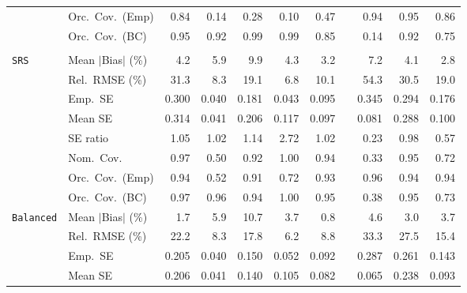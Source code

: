 \begin{landscape}
\begin{longtable}{llrrrrrrrrr}
 & Orc.\ Cov.\ (Emp) & 0.84 & 0.14 & 0.28 & 0.10 & 0.47 &  & \cellcolor{ranktwo}0.94 & \cellcolor{rankone}0.95 & \cellcolor{rankthree}0.86 \\
 & Orc.\ Cov.\ (BC) & \cellcolor{rankone}0.95 & \cellcolor{ranktwo}0.92 & \cellcolor{rankthree}0.99 & \cellcolor{rankthree}0.99 & 0.85 &  & 0.14 & \cellcolor{ranktwo}0.92 & 0.75 \\
\addlinespace[2pt]
\multicolumn{11}{l}{\textbf{Binary \& Categorical Phase-Two Covariates}} \\
\addlinespace[2pt]
\quad \texttt{SRS} & Mean $|$Bias$|$ (\%) & 4.2 & 5.9 & 9.9 & 4.3 & \cellcolor{ranktwo}3.2 &  & 7.2 & \cellcolor{rankthree}4.1 & \cellcolor{rankone}2.8 \\
 & Rel.\ RMSE (\%) & 31.3 & \cellcolor{ranktwo}8.3 & 19.1 & \cellcolor{rankone}6.8 & \cellcolor{rankthree}10.1 &  & 54.3 & 30.5 & 19.0 \\
 & Emp.\ SE & 0.300 & 0.040 & 0.181 & 0.043 & 0.095 &  & 0.345 & 0.294 & 0.176 \\
 & Mean SE & 0.314 & 0.041 & 0.206 & 0.117 & 0.097 &  & 0.081 & 0.288 & 0.100 \\
 & SE ratio & \cellcolor{ranktwo}1.05 & \cellcolor{rankone}1.02 & \cellcolor{rankthree}1.14 & 2.72 & \cellcolor{rankone}1.02 &  & 0.23 & \cellcolor{rankone}0.98 & 0.57 \\
 & Nom.\ Cov. & \cellcolor{rankthree}0.97 & 0.50 & 0.92 & 1.00 & \cellcolor{ranktwo}0.94 &  & 0.33 & \cellcolor{rankone}0.95 & 0.72 \\
 & Orc.\ Cov.\ (Emp) & \cellcolor{rankone}0.94 & 0.52 & \cellcolor{rankthree}0.91 & 0.72 & \cellcolor{ranktwo}0.93 &  & \cellcolor{rankone}0.96 & \cellcolor{rankone}0.94 & \cellcolor{rankone}0.94 \\
 & Orc.\ Cov.\ (BC) & \cellcolor{rankthree}0.97 & \cellcolor{ranktwo}0.96 & \cellcolor{ranktwo}0.94 & 1.00 & \cellcolor{rankone}0.95 &  & 0.38 & \cellcolor{rankone}0.95 & 0.73 \\
\addlinespace[2pt]
\quad \texttt{Balanced} & Mean $|$Bias$|$ (\%) & \cellcolor{ranktwo}1.7 & 5.9 & 10.7 & 3.7 & \cellcolor{rankone}0.8 &  & 4.6 & \cellcolor{rankthree}3.0 & 3.7 \\
 & Rel.\ RMSE (\%) & 22.2 & \cellcolor{ranktwo}8.3 & 17.8 & \cellcolor{rankone}6.2 & \cellcolor{rankthree}8.8 &  & 33.3 & 27.5 & 15.4 \\
 & Emp.\ SE & 0.205 & 0.040 & 0.150 & 0.052 & 0.092 &  & 0.287 & 0.261 & 0.143 \\
 & Mean SE & 0.206 & 0.041 & 0.140 & 0.105 & 0.082 &  & 0.065 & 0.238 & 0.093 \\

\end{longtable}
\end{landscape}
